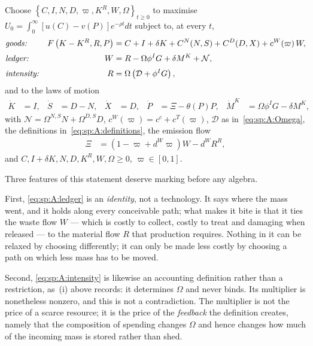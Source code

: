 \begin{problem}\label{prob:sp:A}
Choose $\left\{C,I,N,D,\varpi,K^R,W,\Omega\right\}_{t\ge0}$ to maximise
$U_0=\int_0^\infty\left[u(C)-v(P)\right]e^{-\rho t}dt$ subject to, at every $t$,
\begin{align}
&\text{\emph{goods:}}
&
F\left(K-K^R,R,P\right) &= C+I+\delta K+C^N(N,S)+C^D(D,X)+c^W\!\left(\varpi\right)W,
\label{eq:sp:A:goods}
\\[0.2em]
&\text{\emph{ledger:}}
&
W &= R-\Omega\phi^I G+\delta M^K+\mathcal N,
\label{eq:sp:A:ledger}
\\[0.2em]
&\text{\emph{intensity:}}
&
R &= \Omega\left(\mathcal D+\phi^IG\right),
\label{eq:sp:A:intensity}
\end{align}
and to the laws of motion
\begin{align}
\dot K &= I,
&
\dot S &= D-N,
&
\dot X &= D,
&
\dot P &= \Xi-\theta(P)P,
&
\dot M^K &= \Omega\phi^I G-\delta M^K,
\label{eq:sp:A:states-motion}
\end{align}
with $\mathcal N=\Omega^{N,S}N+\Omega^{D,S}D$, $c^W(\varpi)=c^c+c^T(\varpi)$, $\mathcal D$ as
in~\eqref{eq:sp:A:Omega}, the definitions in~\eqref{eq:sp:A:definitions}, the emission flow
\begin{align}
\Xi &= \left(1-\varpi+d^W\varpi\right)W-d^WR^R,
\label{eq:sp:A:Xi}
\end{align}
and $C,I+\delta K,N,D,K^R,W,\Omega\ge0$, $\varpi\in\left[0,1\right]$.
\end{problem}

Three features of this statement deserve marking before any algebra.

First, \eqref{eq:sp:A:ledger} is an \emph{identity}, not a technology. It says where the mass went,
and it holds along every conceivable path; what makes it bite is that it ties the waste flow $W$ ---
which is costly to collect, costly to treat and damaging when released --- to the material flow $R$
that production requires. Nothing in it can be relaxed by choosing differently; it can only be made
less costly by choosing a path on which less mass has to be moved.

Second, \eqref{eq:sp:A:intensity} is likewise an accounting definition rather than a restriction,
as~(i) above records: it determines $\Omega$ and never binds. Its multiplier is nonetheless nonzero,
and this is not a contradiction. The multiplier is not the price of a scarce resource; it is the price
of the \emph{feedback} the definition creates, namely that the composition of spending changes
$\Omega$ and hence changes how much of the incoming mass is stored rather than shed.

